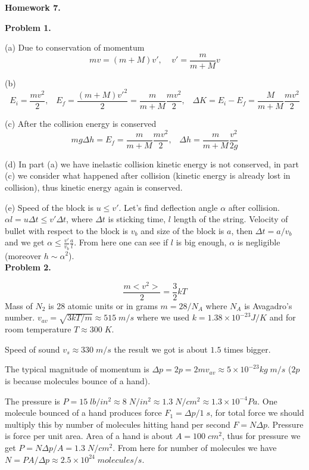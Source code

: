 \documentclass[12pt]{article}
\begin{document}
\begin{center}
{\bf\large Homework 7.}
\end{center}

{\bf Problem 1.}

(a)  Due to conservation of momentum
$$mv=(m+M)v',\;\;\;\; v'=\frac{m}{m+M}v$$

(b) $$E_i=\frac{mv^2}{2},\;\;\;E_f=\frac{(m+M)v'^2}{2}=\frac{m}{m+M}\frac{m v^2}{2},\;\;\;\Delta K=E_i-E_f=\frac{M}{m+M}\frac{m v^2}{2}$$

(c) After the collision energy is conserved
$$mg\Delta h= E_f=\frac{m}{m+M}\frac{m v^2}{2},\;\;\;\Delta h= \frac{m}{m+M}\frac{ v^2}{2 g}$$

(d) In part (a) we have inelastic collision kinetic energy is not conserved, in part (c) we consider what
happened after collision (kinetic energy is already lost in collision), thus kinetic energy again is conserved.

(e) Speed of the block is $u\le v'$. Let's find deflection angle $\alpha$ after collision. $\alpha l=u \Delta t\le v' \Delta t$, where $\Delta t$ is sticking time, $l$ length of the string. Velocity of bullet
with respect to the block is $v_b$ and size of the block is  $a$, then $\Delta t=a/v_b$ and we get
$\alpha\le\frac{v'}{v_b}\frac{a}{l}$. From here one can see if $l$ is big enough, $\alpha$ is negligible (moreover $h\sim\alpha^2$).
\\

{\bf Problem 2.}

$$\frac{m<v^2>}{2}=\frac{3}{2}kT$$
Mass of $N_2$ is 28 atomic units or in grams $m=28/N_A$ where $N_A$ is Avagadro's number.
$v_{av}=\sqrt{3kT/m}\approx515\;m/s$ where we used $k=1.38\times 10^{-23} J/K$ and for room temperature $T\approx 300\;K$. 

Speed of sound $v_s\approx 330\;m/s$ the result we got is about $1.5$ times bigger.

The typical magnitude  of momentum is $\Delta p= 2 p=2mv_{av}\approx 5\times 10^{-23}kg\;m/s$ ($2p$ is because molecules bounce of a hand).

The pressure is $P=15\;lb/in^2\approx 8\;N/in^2\approx 1.3\; N/cm^2\approx 1.3\times 10^{-4}Pa$.
One molecule bounced of a hand produces force $F_1=\Delta p/1\;s$, for total force we should
multiply this by number of molecules hitting hand per second $F=N \Delta p$. Pressure is force
per unit area. Area of a hand is about $A=100\;cm^2$, thus for pressure we get $P=N\Delta p/A=1.3\;N/cm^2$. From here for number of molecules we have $N=P A/\Delta p\approx 2.5\times 10^{24}\;molecules/s$.\\
\\
\end{document}
